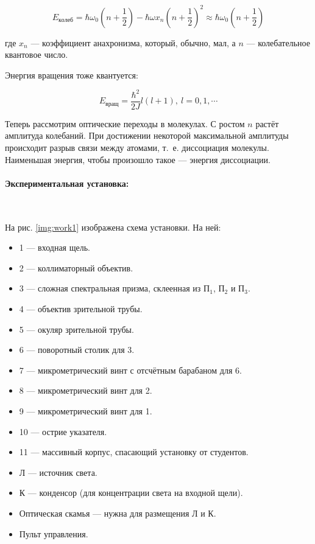 \documentclass[a4paper, 12pt]{article}
\newcommand{\parag}[1]{\paragraph*{#1:}}
\begin{document}
\[
    E_{колеб} = \hbar \omega_0 \left(n + \frac{1}{2}\right) - \hbar \omega x_n \left(n + \frac{1}{2} \right)^2 \approx \hbar \omega_0 \left(n + \frac{1}{2}\right)
\]

где $x_n$ --- коэффициент анахронизма, который, обычно, мал, а $n$ --- колебательное квантовое число.

Энергия вращения тоже квантуется:

\[
    E_{вращ} = \frac{\hbar^2}{2J} l (l+1), ~ l = 0,1, \cdots
\]

Теперь рассмотрим оптические переходы в молекулах. С ростом $n$ растёт амплитуда колебаний. При достижении некоторой максимальной амплитуды происходит разрыв связи между атомами, т.~е. диссоциация молекулы. Наименьшая энергия, чтобы произошло такое --- энергия диссоциации.

\parag {Экспериментальная установка} ~

На рис. \ref{img:work1} изображена схема установки. На ней:

\begin{itemize}
    \item 1 --- входная щель.
    \item 2 --- коллиматорный объектив.
    \item 3 --- сложная спектральная призма, склеенная из $П_1$, $П_2$ и $П_3$.
    \item 4 --- объектив зрительной трубы.
    \item 5 --- окуляр зрительной трубы.
    \item 6 --- поворотный столик для 3.
    \item 7 --- микрометрический винт с отсчётным барабаном для 6.
    \item 8 --- микрометрический винт для 2.
    \item 9 --- микрометрический винт для 1.
    \item 10 --- острие указателя.
    \item 11 --- массивный корпус, спасающий установку от студентов.
    \item Л --- источник света.
    \item К --- конденсор (для концентрации света на входной щели).
    \item Оптическая скамья --- нужна для размещения Л и К.
    \item Пульт управления.
\end{itemize}
\end{document}

